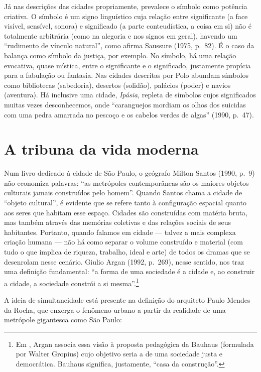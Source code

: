 Já nas descrições das cidades propriamente, prevalece o símbolo como
potência criativa. O símbolo é um signo linguístico cuja relação entre
significante (a face visível, sensível, sonora) e significado (a parte
conteudística, a coisa em si) não é totalmente arbitrária (como na
alegoria e nos signos em geral), havendo um ``rudimento de vínculo
natural'', como afirma Saussure (1975, p.~82). É o caso da balança como
símbolo da justiça, por exemplo. No símbolo, há uma relação evocativa,
quase mística, entre o significante e o significado, justamente propícia
para a fabulação ou fantasia. Nas cidades descritas por Polo abundam
símbolos como bibliotecas (sabedoria), desertos (solidão), palácios
(poder) e navios (aventura). Há inclusive uma cidade, \emph{Ipásia},
repleta de símbolos cujos significados muitas vezes desconhecemos, onde
``caranguejos mordiam os olhos dos suicidas com uma pedra amarrada no
pescoço e os cabelos verdes de algas'' (1990, p.~47).

\chapter{A tribuna da vida moderna}

Num livro dedicado à cidade de São Paulo, o geógrafo Milton Santos
(1990, p.~9) não economiza palavras: ``as metrópoles contemporâneas são
os maiores objetos culturais jamais construídos pelo homem''. Quando
Santos chama a cidade de ``objeto cultural'', é evidente que se refere
tanto à configuração espacial quanto aos seres que habitam esse espaço.
Cidades são construídas com matéria bruta, mas também através das
memórias coletivas e das relações sociais de seus habitantes. Portanto,
quando falamos em cidade --- talvez a mais complexa criação humana --- não
há como separar o volume construído e material (com tudo o que implica
de riqueza, trabalho, ideal e arte) de todos os dramas que se desenrolam
nesse cenário. Giulio Argan (1992, p.~269), nesse sentido, nos traz uma definição
fundamental: ``a forma de uma sociedade é a cidade e, ao construir a
cidade, a sociedade constrói a si mesma''.\footnote{Em
  {}, Argan associa essa visão à proposta pedagógica da
  Bauhaus (formulada por Walter Gropius) cujo objetivo seria a
  {} de uma sociedade justa e democrática. Bauhaus
  significa, justamente, ``casa da construção''.}

A ideia de simultaneidade está presente na definição do arquiteto Paulo
Mendes da Rocha, que enxerga o fenômeno urbano a
partir da realidade de uma metrópole gigantesca como São Paulo:

